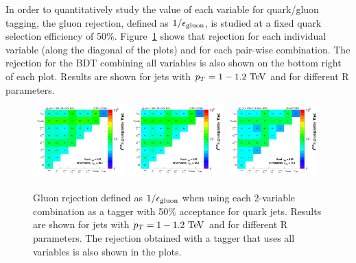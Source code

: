 In order to quantitatively study the value of each variable for quark/gluon tagging, the gluon 
rejection, defined as $1/\epsilon_{\rm gluon}$, is studied at a fixed quark selection efficiency
of 50\%. Figure~\ref{fig:qg_pt1000_comb} shows that rejection for each individual variable
(along the diagonal of the plots) and for each pair-wise combination. The rejection for the 
BDT combining all variables is also shown on the bottom right of each plot. Results are shown
for jets with $\pt=1-1.2 \TeV$ and for different R parameters.
\begin{figure}
\begin{center}
\includegraphics[width=0.32\textwidth]{./Figures/QGTagging/pT1000/AKtR04/effBkg2D.png}
\includegraphics[width=0.32\textwidth]{./Figures/QGTagging/pT1000/AKtR08/effBkg2D.png}
\includegraphics[width=0.32\textwidth]{./Figures/QGTagging/pT1000/AKtR12/effBkg2D.png}
\caption{Gluon rejection defined as $1/\epsilon_{\rm gluon}$ when using each 2-variable combination 
as a tagger with 50\% acceptance for quark jets. Results are shown for jets with $\pt=1-1.2 \TeV$ and
for different R parameters. The rejection obtained with a tagger that uses all variables is also shown
in the plots. }
\label{fig:qg_pt1000_comb}
\end{center}
\end{figure}
